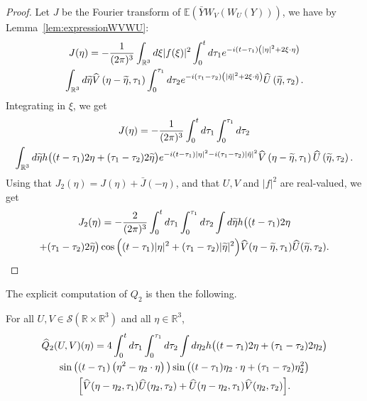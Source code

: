\documentclass[AHL, Unicode, longabstracts,published]{cedram}
\newcommand{\R}{\mathbb{R}}
\newcommand{\E}{\mathbb{E}}
\newcommand{\mclS}{\mathcal{S}}
\let\oldtilde\tilde
\renewcommand*{\tilde}[1]{\mathchoice{\widetilde{#1}}{\widetilde{#1}}{\oldtilde{#1}}{\oldtilde{#1}}}
\let\oldhat\hat
\renewcommand*{\hat}[1]{\mathchoice{\widehat{#1}}{\widehat{#1}}{\oldhat{#1}}{\oldhat{#1}}}
\begin{document}
\begin{proof}
Let $J$ be the Fourier transform of $\E(\bar Y W_V(W_U(Y)))$, we have by Lem\-ma~\ref{lem:expressionWVWU}:
\begin{multline*}
J(\eta) = -\frac{1}{(2\pi)^3} \int_{\R^3} d\xi |f(\xi)|^2 \int_{0}^t d\tau_1 e^{-i (t-\tau_1)\left(|\eta|^2 + 2\xi \cdot \eta\right)}\\ \int_{\R^3} d\tilde{\eta} \hat V\left(\eta-\tilde{\eta},\tau_1\right) 
\int_{0}^{\tau_1} d\tau_2 e^{-i (\tau_1 - \tau_2)\left(|\tilde{\eta}|^2 + 2\xi\cdot \tilde \eta\right)} \hat U \left(\tilde{\eta},\tau_2\right).
\end{multline*}
Integrating in $\xi$, we get
\begin{multline*}
J(\eta) =
-\frac{1}{(2\pi)^3}\int_{0}^t d\tau_1 \int_{0}^{\tau_1} d\tau_2\\
\int_{\R^3} d\tilde{\eta} h\big((t-\tau_1)2\eta + (\tau_1 - \tau_2) 2\tilde{\eta}\big) e^{-i(t-\tau_1) |\eta|^2 -i (\tau_1 - \tau_2)|\tilde{\eta}|^2}
\hat V\left(\eta-\tilde{\eta},\tau_1\right) \hat U \left(\tilde{\eta},\tau_2\right).
\end{multline*}
Using that $J_2(\eta) = J(\eta) + \bar J(-\eta)$, and that $U, V$ and $|f|^2$ are real-valued, we get
\begin{multline*}
J_2(\eta) = -\frac{2}{(2\pi)^3} \int_{0}^t d\tau_1 \int_{0}^{\tau_1} d\tau_2 \int d\tilde{\eta} h\big((t-\tau_1)2\eta \\
+ (\tau_1 - \tau_2) 2\tilde{\eta}\big) \cos\Big((t-\tau_1) |\eta|^2 + (\tau_1 - \tau_2)|\tilde{\eta}|^2\Big) \hat V(\eta-\tilde{\eta},\tau_1) \hat U (\tilde{\eta},\tau_2).\qedhere
\end{multline*}
\end{proof}

The explicit computation of $Q_2$ is then the following.

\begin{prop}
For all $U,V \in \mclS(\R\times \R^3)$ and all $\eta \in \R^3$,
\begin{multline}\label{id:expressionQ2}
\hat Q_2(U,V) (\eta)=
 4 \int_{0}^t d\tau_1 \int_{0}^{\tau_1} d\tau_2 \int d\eta_2 h\big((t-\tau_1)2\eta + (\tau_1 - \tau_2) 2\eta_2\big) \\
\sin \big((t-\tau_1)\left(\eta^2-\eta_2\cdot \eta\right)\big) \sin\big((t-\tau_1)\eta_2\cdot \eta + (\tau_1 - \tau_2)\eta_2^2\big) \\
\Big[\hat V(\eta-\eta_2,\tau_1) \hat U (\eta_2,\tau_2) + \hat U(\eta-\eta_2,\tau_1) \hat V (\eta_2,\tau_2) \Big].
\end{multline}
\end{prop}
\end{document}
